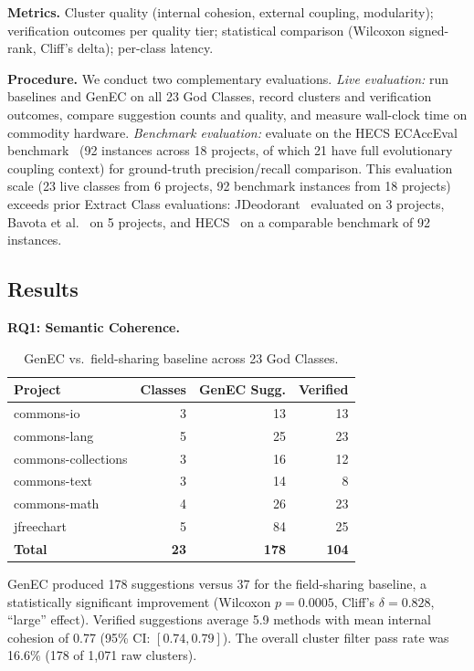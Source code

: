 \documentclass[sigconf]{acmart}
\begin{document}
\textbf{Metrics.}  Cluster quality (internal cohesion, external coupling,
modularity); verification outcomes per quality tier; statistical comparison
(Wilcoxon signed-rank, Cliff's delta); per-class latency.

\textbf{Procedure.}  We conduct two complementary evaluations.
\emph{Live evaluation:} run baselines and GenEC on all 23 God Classes, record
clusters and verification outcomes, compare suggestion counts and quality, and
measure wall-clock time on commodity hardware.
\emph{Benchmark evaluation:} evaluate on the HECS ECAccEval
benchmark~\cite{Cui2024HECS} (92 instances across 18 projects, of which 21 have
full evolutionary coupling context) for ground-truth precision/recall comparison.
This evaluation scale (23 live classes from 6 projects, 92 benchmark
instances from 18 projects) exceeds prior Extract Class evaluations:
JDeodorant~\cite{Fokaefs2011JDeodorant} evaluated on 3 projects,
Bavota et al.~\cite{Bavota2013EMSE} on 5 projects, and
HECS~\cite{Cui2024HECS} on a comparable benchmark of 92 instances.

\subsection{Results}
\label{sec:results}

\textbf{RQ1: Semantic Coherence.}

\begin{table}[t]
\centering\small
\caption{GenEC vs.\ field-sharing baseline across 23 God Classes.}
\label{tab:rq1}
\begin{tabular}{@{}lrrr@{}}
\toprule
\textbf{Project} & \textbf{Classes} & \textbf{GenEC Sugg.} & \textbf{Verified} \\
\midrule
commons-io         & 3 & 13 & 13 \\
commons-lang       & 5 & 25 & 23 \\
commons-collections & 3 & 16 & 12 \\
commons-text       & 3 & 14 &  8 \\
commons-math       & 4 & 26 & 23 \\
jfreechart         & 5 & 84 & 25 \\
\midrule
\textbf{Total}     & \textbf{23} & \textbf{178} & \textbf{104} \\
\bottomrule
\end{tabular}
\end{table}

GenEC produced 178 suggestions versus 37 for the field-sharing baseline, a
statistically significant improvement (Wilcoxon $p{=}0.0005$, Cliff's
$\delta{=}0.828$, ``large'' effect). Verified suggestions average 5.9 methods
with mean internal cohesion of 0.77 (95\% CI: $[0.74, 0.79]$). The overall
cluster filter pass rate was 16.6\% (178 of 1,071 raw clusters).
\end{document}
